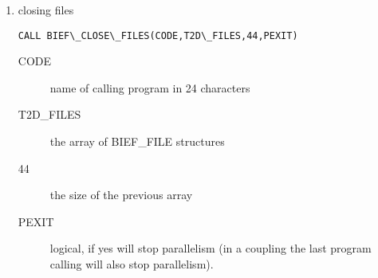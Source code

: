 \begin{enumerate}
\item closing files

\begin{lstlisting}[language=TelFortran]
CALL BIEF\_CLOSE\_FILES(CODE,T2D\_FILES,44,PEXIT)
\end{lstlisting}
\begin{description}
  \item [CODE] name of calling program in 24 characters
  \item [T2D\_FILES] the array of BIEF\_FILE structures
  \item [44] the size of the previous array
  \item [PEXIT] logical, if yes will stop parallelism (in a coupling the last
    program calling  will also stop parallelism).
\end{description}
\end{enumerate}


